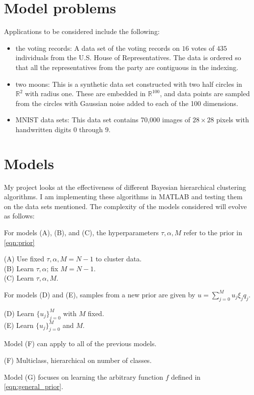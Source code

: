 \documentclass{siamart1116}
\begin{document}
\section{Model problems}
Applications to be considered include the following:
\begin{itemize}
\item the voting records: A data set of the voting records on $16$ votes of $435$ individuals from the U.S. House of Representatives. The data is ordered so that all the representatives from the party are contiguous in the indexing.
\item two moons: This is a synthetic data set constructed with two half circles in $\mathbb{R}^2$ with radius one. These are embedded in $\mathbb{R}^{100}$, and data points are sampled from the circles with Gaussian noise added to each of the 100 dimensions.
\item MNIST data sets: This data set contains 70,000 images of $28 \times 28$ pixels with handwritten digits $0$ through $9$.
\end{itemize}

\section{Models}
My project looks at the effectiveness of different Bayesian hierarchical clustering algorithms. I am implementing these algorithms in MATLAB and testing them on the data sets mentioned. The complexity of the models considered will evolve as follows:

For models (A), (B), and (C), the hyperparameters $\tau,\alpha,M$ refer to the prior in \cref{eqn:prior}

(A) Use fixed $\tau,\alpha, M=N-1$ to cluster data.\\
(B) Learn $\tau,\alpha$; fix $M=N-1$.\\
(C) Learn $\tau,\alpha,M$.

For models (D) and (E), samples from a new prior are given by $u = \sum_{j=0}^M u_j\xi_j q_j$.

(D) Learn $\{u_j\}_{j=0}^M$ with $M$ fixed.\\
(E) Learn $\{u_j\}_{j=0}^M$ and $M$.

Model (F) can apply to all of the previous models.

(F) Multiclass, hierarchical on number of classes.

Model (G) focuses on learning the arbitrary function $f$ defined in \cref{eqn:general_prior}. 
\end{document}
